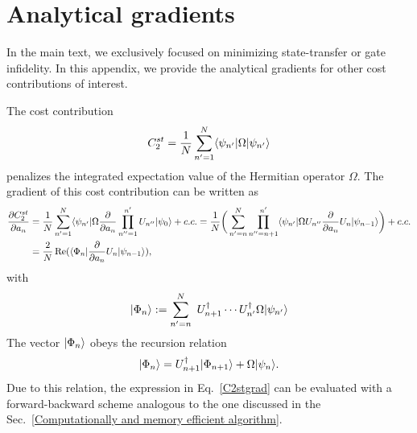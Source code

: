 \section{Analytical gradients}
\label{gradient}
In the main text, we exclusively focused on minimizing state-transfer or gate infidelity. In this appendix, we provide the analytical gradients for other cost contributions of interest. 

The cost contribution 
\begin{equation}
\label{c2st}
C_2^{st}=\frac{1}{N}\sum_{n'=1}^N \langle\psi_{n'}|\Omega |\psi_{n'}\rangle
\end{equation} 
penalizes the integrated expectation value of the Hermitian operator $\Omega$. The gradient of this cost contribution can be written as
\begin{align}
\nonumber \frac{\partial C_{2}^{st} }{\partial a_{n}}
&=\frac{1}{N}\sum_{n'=1}^N \langle\psi_{n'}|\Omega \frac{\partial }{\partial a_{n}}\prod_{n''=1}^{n'}U_{n''}|\psi_{0}\rangle+c.c.=\frac{1}{N}\bigg(\sum_{n'=n}^N \prod_{n''=n+1}^{n'} \langle\psi_{n'}|\Omega U_{n''} \frac{\partial }{\partial a_{n}}U_n|\psi_{n-1}\rangle\bigg)+c.c.\\
\label{C2stgrad} &=\frac{2}{N}\operatorname{Re} (\langle\Phi_{n}|\frac{\partial }{\partial a_{n}}U_n |\psi_{n-1}\rangle),
\end{align}
with
\begin{equation}
    |\Phi_n\rangle:=\sum_{n'= n}^N~ U_{n+1}^\dagger \cdots U_{n'}^\dagger \Omega|\psi_{n'}\rangle
\end{equation}
The vector $|\Phi_n\rangle$ obeys the recursion relation
\begin{equation}
    |\Phi_n\rangle=U_{n+1}^\dagger |\Phi_{n+1}\rangle+\Omega |\psi_n\rangle.
\end{equation}
Due to this relation, the expression in Eq.\ \eqref{C2stgrad} can be evaluated with a forward-backward scheme analogous to the one discussed in the Sec.\ \ref{Computationally and memory efficient algorithm}.

